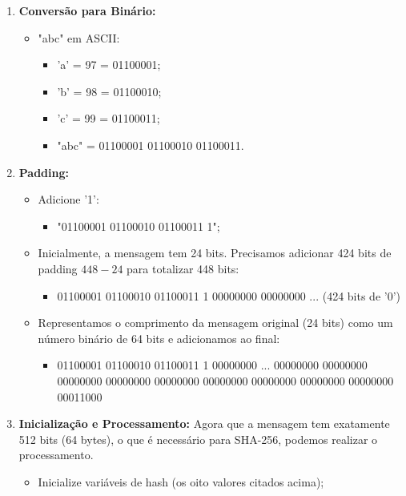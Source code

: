 \documentclass[a4paper,12pt]{article}
\begin{document}
\begin{enumerate}
    \item \textbf{Conversão para Binário:}
        \begin{itemize}
            \item "abc" em ASCII:
                \begin{itemize}
                    \item 'a' = 97 = 01100001;
                    \item 'b' = 98 = 01100010;
                    \item 'c' = 99 = 01100011;
                    \item "abc" = 01100001 01100010 01100011.
                \end{itemize}
        \end{itemize}
    \item \textbf{Padding:}
        \begin{itemize}
            \item Adicione '1':
            \begin{itemize}
                \item "01100001 01100010 01100011 1";
            \end{itemize}
            \item Inicialmente, a mensagem tem 24 bits. Precisamos adicionar 424 bits de padding \(448 - 24\) para totalizar 448 bits:
                \begin{itemize}
                    \item 01100001 01100010 01100011 1 00000000 00000000 ... (424 bits de '0')
                \end{itemize}
            \item Representamos o comprimento da mensagem original (24 bits) como um número binário de 64 bits e adicionamos ao final:
                \begin{itemize}
                    \item 01100001 01100010 01100011 1 00000000 ... 00000000 00000000 00000000 00000000 00000000 00000000 00000000 00000000 00000000 00011000
                \end{itemize}
        \end{itemize}
    \item \textbf{Inicialização e Processamento:}
        Agora que a mensagem tem exatamente 512 bits (64 bytes), o que é necessário para SHA-256, podemos realizar o processamento.
        \begin{itemize}
            \item Inicialize variáveis de hash (os oito valores citados acima);

\end{itemize}
\end{enumerate}
\end{document}
